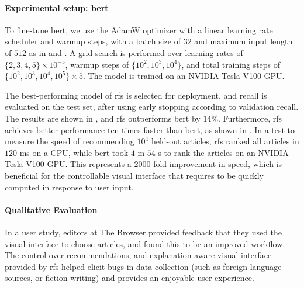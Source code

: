 \paragraph{Experimental setup: \acrshort{bert}} To fine-tune \acrshort{bert}, we use the AdamW optimizer with a linear learning rate scheduler and warmup steps, with a batch size of $32$ and maximum input length of $512$ as in \citet{devlin2019bert:} and \citet{wolf2019huggingfaces}. A grid search is performed over learning rates of $\{2, 3, 4, 5\} \times 10^{-5}$, warmup steps of $\{10^2, 10^3, 10^4\}$, and total training steps of $\{10^2, 10^3, 10^4, 10^5\} \times 5$. The model is trained on an NVIDIA Tesla V100 GPU.

The best-performing model of \gls{rfs} is selected for deployment, and recall is evaluated on the test set, after using early stopping according to validation recall. The results are shown in , and \gls{rfs} outperforms \acrshort{bert} by $14\%$. Furthermore, \gls{rfs} achieves better performance ten times faster than \acrshort{bert}, as shown in . In a test to measure the speed of recommending $10^4$ held-out articles, \gls{rfs} ranked all articles in $120$ ms on a CPU, while \acrshort{bert} took $4$ m $54$ s to rank the articles on an NVIDIA Tesla V100 GPU. This represents a 2000-fold improvement in speed, which is beneficial for the controllable visual interface that requires  to be quickly computed in response to user input.




\paragraph{Qualitative Evaluation} In a user study, editors at The Browser provided feedback that they used the visual interface to choose articles, and found this to be an improved workflow. The control over recommendations, and explanation-aware visual interface provided by \gls{rfs} helped elicit bugs in data collection (such as foreign language sources, or fiction writing) and provides an enjoyable user experience.